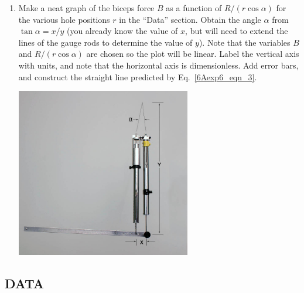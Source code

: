 \begin{enumerate}[label=\arabic*.]
\item Make a neat graph of the biceps force \(B\) as a function of \(R/(r\cos\alpha)\) for the various hole positions \(r\) in the ``Data'' section.  Obtain the angle \(\alpha\) from \(\tan\alpha = x/y\) (you already know the value of \(x\), but will need to extend the lines of the gauge rods to determine the value of \(y\)).  Note that the variables \(B\) and \(R/(r\cos\alpha)\) are chosen so the plot will be linear.  Label the vertical axis with units, and note that the horizontal axis is dimensionless.  Add error bars, and construct the straight line predicted by Eq.~\ref{6Aexp6_eqn_3}.
\begin{center} \includegraphics*[width=0.6\textwidth]{imgs/6labs/6Alab/6Aexp6/6a_6_7_DIAGRAM_fixalpha.jpg} \end{center}

\end{enumerate}

\subsection*{DATA}

